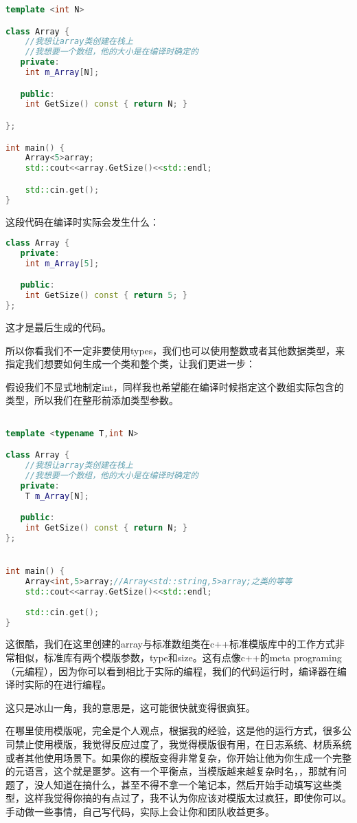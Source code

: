 \begin{lstlisting}[language=c++]
template <int N>

class Array {
    //我想让array类创建在栈上
    //我想要一个数组，他的大小是在编译时确定的
   private:
    int m_Array[N];

   public:
    int GetSize() const { return N; }

};

int main() {
    Array<5>array;
    std::cout<<array.GetSize()<<std::endl;

    std::cin.get();
}
\end{lstlisting}

这段代码在编译时实际会发生什么：

\begin{lstlisting}[language=c++]
class Array {
   private:
    int m_Array[5];

   public:
    int GetSize() const { return 5; }
};
\end{lstlisting}

这才是最后生成的代码。

所以你看我们不一定非要使用types，我们也可以使用整数或者其他数据类型，来指定我们想要如何生成一个类和整个类，让我们更进一步：

假设我们不显式地制定{\ncodestyle int}，同样我也希望能在编译时候指定这个数组实际包含的类型，所以我们在整形前添加类型参数。

\begin{lstlisting}[language=c++]

template <typename T,int N>

class Array {
    //我想让array类创建在栈上
    //我想要一个数组，他的大小是在编译时确定的
   private:
    T m_Array[N];

   public:
    int GetSize() const { return N; }
};


int main() {
    Array<int,5>array;//Array<std::string,5>array;之类的等等
    std::cout<<array.GetSize()<<std::endl;
    
    std::cin.get();
}
\end{lstlisting}

这很酷，我们在这里创建的array与标准数组类在c++标准模版库中的工作方式非常相似，标准库有两个模版参数，type和size。这有点像c++的meta programing（元编程），因为你可以看到相比于实际的编程，我们的代码运行时，编译器在编译时实际的在进行编程。

这只是冰山一角，我的意思是，这可能很快就变得很疯狂。

在哪里使用模版呢，完全是个人观点，根据我的经验，这是他的运行方式，很多公司禁止使用模版，我觉得反应过度了，我觉得模版很有用，在日志系统、材质系统或者其他使用场景下。如果你的模版变得非常复杂，你开始让他为你生成一个完整的元语言，这个就是噩梦。这有一个平衡点，当模版越来越复杂时名，，那就有问题了，没人知道在搞什么，甚至不得不拿一个笔记本，然后开始手动填写这些类型，这样我觉得你搞的有点过了，我不认为你应该对模版太过疯狂，即使你可以。手动做一些事情，自己写代码，实际上会让你和团队收益更多。


